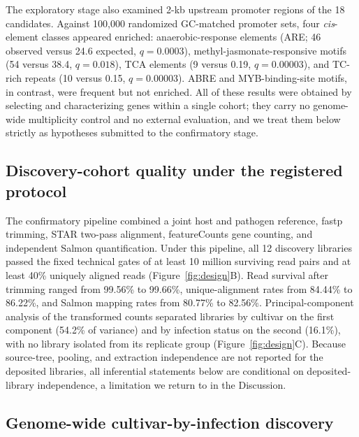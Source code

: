 \documentclass[11pt]{article}
\newcommand{\q}{\textit{q}}
\begin{document}
The exploratory stage also examined 2-kb upstream promoter regions of the 18 candidates. Against 100,000 randomized GC-matched promoter sets, four \textit{cis}-element classes appeared enriched: anaerobic-response elements (ARE; 46 observed versus 24.6 expected, $\q=0.0003$), methyl-jasmonate-responsive motifs (54 versus 38.4, $\q=0.018$), TCA elements (9 versus 0.19, $\q=0.00003$), and TC-rich repeats (10 versus 0.15, $\q=0.00003$). ABRE and MYB-binding-site motifs, in contrast, were frequent but not enriched. All of these results were obtained by selecting and characterizing genes within a single cohort; they carry no genome-wide multiplicity control and no external evaluation, and we treat them below strictly as hypotheses submitted to the confirmatory stage.

\subsection{Discovery-cohort quality under the registered protocol}

The confirmatory pipeline combined a joint host and pathogen reference, fastp trimming, STAR two-pass alignment, featureCounts gene counting, and independent Salmon quantification. Under this pipeline, all 12 discovery libraries passed the fixed technical gates of at least 10 million surviving read pairs and at least 40\% uniquely aligned reads (Figure~\ref{fig:design}B). Read survival after trimming ranged from 99.56\% to 99.66\%, unique-alignment rates from 84.44\% to 86.22\%, and Salmon mapping rates from 80.77\% to 82.56\%. Principal-component analysis of the transformed counts separated libraries by cultivar on the first component (54.2\% of variance) and by infection status on the second (16.1\%), with no library isolated from its replicate group (Figure~\ref{fig:design}C). Because source-tree, pooling, and extraction independence are not reported for the deposited libraries, all inferential statements below are conditional on deposited-library independence, a limitation we return to in the Discussion.

\subsection{Genome-wide cultivar-by-infection discovery}
\end{document}
